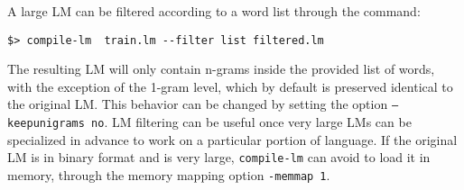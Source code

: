 A large LM can be filtered according to a word list through the command:

\begin{verbatim}
$> compile-lm  train.lm --filter list filtered.lm
\end{verbatim}
The resulting LM will only contain n-grams inside the provided list of words,
with the exception of the 1-gram level, which by default is preserved identical
to the original LM. This behavior can be changed by setting the option 
{\tt --keepunigrams no}.  LM filtering can be useful once very large LMs can
be specialized in advance to work on a particular portion of language.
\noindent
If the original LM is in binary format and is very large, {\tt compile-lm} can avoid to load it in memory,
through the memory mapping option {\tt -memmap 1}.



